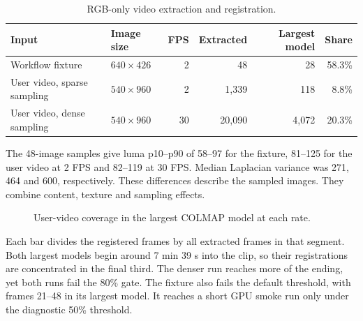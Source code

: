\documentclass[11pt,a4paper]{article}
\begin{document}
\begin{table}[!ht]
\centering\small
\begin{tabularx}{\linewidth}{@{}Ylrrrr@{}}
\toprule
\textbf{Input} & \textbf{Image size} & \textbf{FPS} & \textbf{Extracted} & \textbf{Largest model} & \textbf{Share} \\
\midrule
Workflow fixture & $640\times426$ & 2 & 48 & 28 & 58.3\% \\
User video, sparse sampling & $540\times960$ & 2 & 1,339 & 118 & 8.8\% \\
User video, dense sampling & $540\times960$ & 30 & 20,090 & 4,072 & 20.3\% \\
\bottomrule
\end{tabularx}
\caption{RGB-only video extraction and registration.}
\label{tab:video-data}
\end{table}

The 48-image samples give luma p10--p90 of 58--97 for the fixture, 81--125
for the user video at 2 FPS and 82--119 at 30 FPS. Median Laplacian variance
was 271, 464 and 600, respectively. These differences describe the sampled
images. They combine content, texture and sampling effects.

\begin{figure}[!ht]
\centering
{}
\caption{User-video coverage in the largest COLMAP model at each rate.}
\label{fig:video-coverage}
\end{figure}

Each bar divides the registered frames by all extracted frames in that
segment. Both largest models begin around 7 min 39 s into the clip, so
their registrations are concentrated in the final third. The denser run
reaches more of the ending, yet both runs fail the 80\% gate. The fixture
also fails the default threshold, with frames 21--48 in its largest model.
It reaches a short GPU smoke run only under the diagnostic 50\% threshold.
\end{document}
